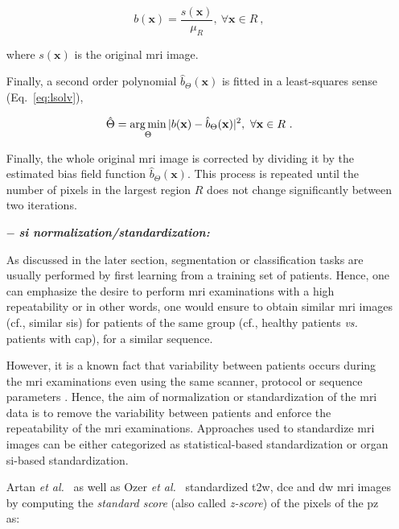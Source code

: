 \begin{enumerate}[leftmargin=*]
{\begin{equation}
	b(\mathbf{x}) = \frac{s(\mathbf{x})}{\mu_{R}}, \ \forall \mathbf{x} \in R \ ,
	\label{eq:backest}
\end{equation}

\noindent where $s(\mathbf{x})$ is the original \ac{mri} image.

Finally, a second order polynomial $\hat{b}_{\Theta}(\mathbf{x})$ is fitted in a least-squares sense (Eq.~\eqref{eq:lsolv}),

\begin{equation}
	\hat{\Theta} = \operatorname*{arg\,min}_{\Theta} | b(\mathbf{x}) - \hat{b}_{\Theta}(\mathbf{x}) |^{2}, \ \forall \mathbf{x} \in R \ .
	\label{eq:lsolv}
\end{equation}

Finally, the whole original \ac{mri} image is corrected by dividing it by the estimated bias field function $\hat{b}_{\Theta}(\mathbf{x})$.
This process is repeated until the number of pixels in the largest region $R$ does not change significantly between two iterations.
}

\item[$-$] \textbf{\textit{\Ac{si} normalization/standardization:}}

As discussed in the later section, segmentation or classification tasks are usually performed by first learning from a training set of patients.
Hence, one can emphasize the desire to perform \ac{mri} examinations with a high repeatability or in other words, one would ensure to obtain similar \ac{mri} images (cf., similar \acp{si}) for patients of the same group (cf., healthy patients \textit{vs.} patients with \ac{cap}), for a similar sequence.

However, it is a known fact that variability between patients occurs during the \ac{mri} examinations even using the same scanner, protocol or sequence parameters \cite{Nyul1999}.
Hence, the aim of normalization or standardization of the \ac{mri} data is to remove the variability between patients and enforce the repeatability of the \ac{mri} examinations.
Approaches used to standardize \ac{mri} images can be either categorized as statistical-based standardization or organ \ac{si}-based standardization. 

Artan \textit{et al.}~\cite{Artan2009,Artan2010} as well as Ozer \textit{et al.}~\cite{Ozer2009,Ozer2010} standardized \ac{t2w}, \ac{dce} and \ac{dw} \ac{mri} images by computing the \textit{standard score} (also called \textit{z-score}) of the pixels of the \ac{pz} as:


\end{enumerate}
